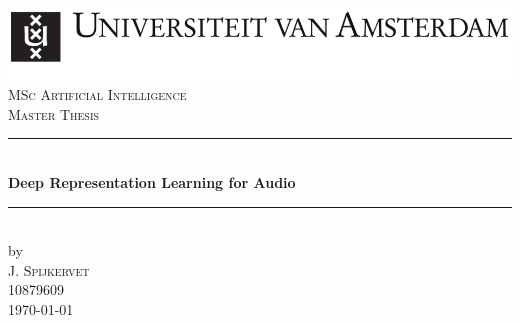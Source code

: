 \documentclass{report}
\newcommand{\red}[1]{{\color{red}{#1}}}
\begin{document}
\begin{titlepage}

\newcommand{\HRule}{\rule{\linewidth}{0.5mm}} %
\center %
 

\includegraphics[width=\linewidth]{images/uva.jpeg}\\[2.5cm]
\textsc{\Large MSc Artificial Intelligence}\\[0.2cm]
\textsc{\Large Master Thesis}\\[0.5cm] 


\HRule \\[0.4cm]
{ \huge \bfseries Deep Representation Learning for Audio}\\[0.4cm] %
\HRule \\[0.5cm]
 

by\\[0.2cm]
\textsc{\Large J. Spijkervet}\\[0.2cm] %
10879609\\[1cm]



{\Large \today}\\[1cm] %


\end{titlepage}
\end{document}
